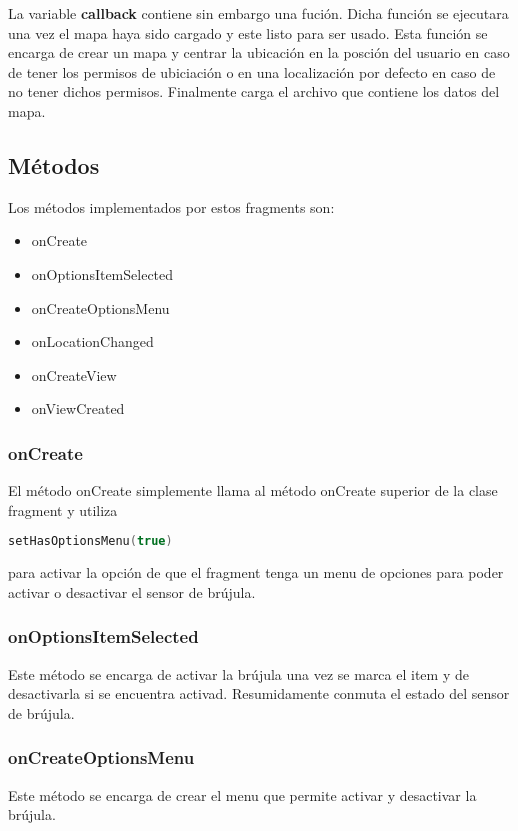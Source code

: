La variable \textbf{callback} contiene sin embargo una fución. Dicha función se ejecutara una vez el mapa haya sido cargado y este listo para ser usado. Esta función se encarga de crear un mapa y centrar la ubicación en la posción del usuario en caso de tener los permisos de ubiciación o en una localización por defecto en caso de no tener dichos permisos. Finalmente carga el archivo que contiene los datos del mapa.

\newpage

\subsection{Métodos}
Los métodos implementados por estos fragments son:

\begin{itemize}
	\item onCreate
	\item onOptionsItemSelected
	\item onCreateOptionsMenu
	\item onLocationChanged
	\item onCreateView
	\item onViewCreated
\end{itemize}

\subsubsection{onCreate}
El método onCreate simplemente llama al método onCreate superior de la clase fragment y utiliza
\begin{lstlisting}[language=Kotlin]
setHasOptionsMenu(true)
\end{lstlisting}
para activar la opción de que el fragment tenga un menu de opciones para poder activar o desactivar el sensor de brújula.

\subsubsection{onOptionsItemSelected}
Este método se encarga de activar la brújula una vez se marca el item y de desactivarla si se encuentra activad. Resumidamente conmuta el estado del sensor de brújula.

\subsubsection{onCreateOptionsMenu}
Este método se encarga de crear el menu que permite activar y desactivar la brújula.

